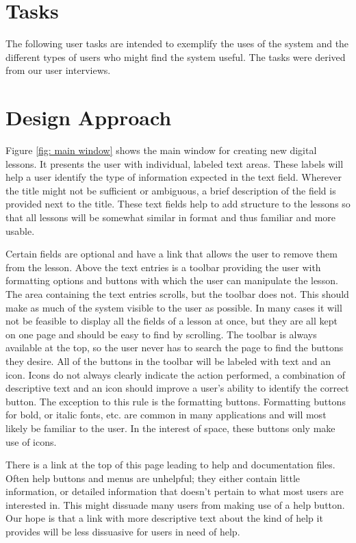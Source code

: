 \documentclass[10pt,letter]{article}
\begin{document}
\section{Tasks}
The following user tasks are intended to exemplify the uses of the system and
the different types of users who might find the system useful. The tasks were
derived from our user interviews.



\section{Design Approach}
Figure \ref{fig: main window} shows the main window for creating new digital
lessons. It presents the user with individual, labeled text areas. These labels
will help a user identify the type of information expected in the text field.
Wherever the title might not be sufficient or ambiguous, a brief description of
the field is provided next to the title. These text fields help to add
structure to the lessons so that all lessons will be somewhat similar in format
and thus familiar and more usable.

Certain fields are optional and have a link that allows the user to remove them
from the lesson. Above the text entries is a toolbar providing the user with
formatting options and buttons with which the user can manipulate the lesson.
The area containing the text entries scrolls, but the toolbar does not. This
should make as much of the system visible to the user as possible. In many cases
it will not be feasible to display all the fields of a lesson at once, but they
are all kept on one page and should be easy to find by scrolling. The toolbar is
always available at the top, so the user never has to search the page to find
the buttons they desire. All of the buttons in the toolbar will be labeled with
text and an icon. Icons do not always clearly indicate the action performed, a
combination of descriptive text and an icon should improve a user's ability to
identify the correct button. The exception to this rule is the formatting
buttons. Formatting buttons for bold, or italic fonts, etc. are common in many
applications and will most likely be familiar to the user. In the interest of
space, these buttons only make use of icons.

There is a link at the top of this page leading to help and documentation files.
Often help buttons and menus are unhelpful; they either contain little
information, or detailed information that doesn't pertain to what most users are
interested in. This might dissuade many users from making use of a help button.
Our hope is that a link with more descriptive text about the kind of help it
provides will be less dissuasive for users in need of help.
\end{document}
